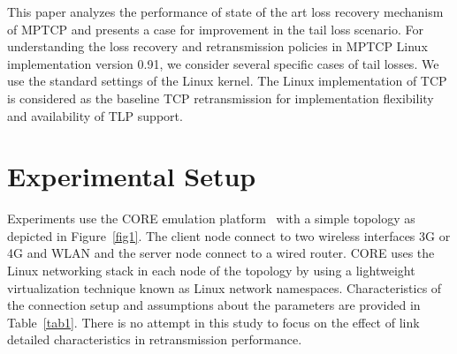 \documentclass[10pt,conference,compsoc]{IEEEtran}
\begin{document}

This paper analyzes the performance of state of the art loss recovery mechanism of MPTCP and presents a case for improvement in the tail loss scenario. 
For understanding the loss recovery and retransmission policies in MPTCP Linux implementation version 0.91, we consider several specific cases of tail losses.  
We use the standard settings of the Linux kernel.
The Linux implementation of TCP is considered as the baseline TCP retransmission for implementation flexibility and availability of TLP support.

\section{Experimental Setup}\label{exsetup}

Experiments use the CORE emulation platform~\cite{CORE} with a simple topology as depicted in Figure~\ref{fig1}. The client node connect to two wireless interfaces 3G or 4G and WLAN and the server node connect to a wired router.
CORE uses the Linux networking stack in each node of the topology by using a lightweight virtualization technique known as Linux network namespaces.
Characteristics of the connection setup and assumptions about the parameters are provided in Table~\ref{tab1}.
There is no attempt in this study to focus on the effect of link detailed characteristics in retransmission performance.
\end{document}
